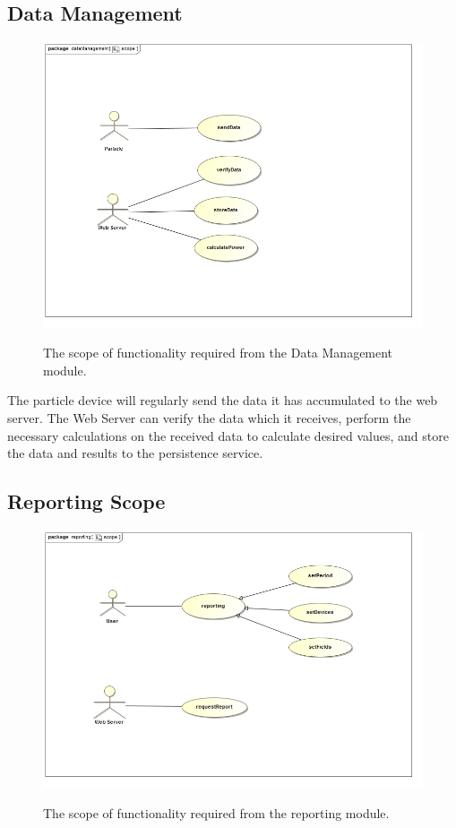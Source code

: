 \documentclass[paper=a4, fontsize=11pt]{scrartcl} %
\begin{document}
	\subsection{Data Management}
		\begin{figure}
			\includegraphics[width=\textwidth]{images/dataManagementScope.jpg}  \\
			\caption{The scope of functionality required from the Data Management module.}
		\end{figure}
		
		The particle device will regularly send the data it has accumulated to the web server. The Web Server can verify the data which it receives, perform the necessary calculations on the received data to calculate desired values, and store the data and results to the persistence service.
		
	\subsection{Reporting Scope}
	\begin{figure}
		\includegraphics[width=\textwidth]{images/reportingScope.jpg}  \\
		\caption{The scope of functionality required from the reporting module.}
	\end{figure}
	
\end{document}
